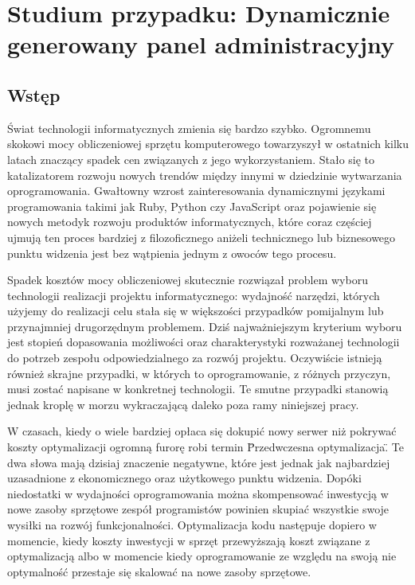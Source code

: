 \chapter[Studium przypadku: Dynamicznie generowany panel administracyjny]{Studium przypadku: Dynamicznie generowany panel administracyjny}
  \section{Wstęp}
  Świat technologii informatycznych zmienia się bardzo szybko. Ogromnemu skokowi mocy obliczeniowej sprzętu komputerowego towarzyszył w ostatnich kilku latach znaczący spadek cen związanych z jego wykorzystaniem. Stało się to katalizatorem rozwoju nowych trendów między innymi w dziedzinie wytwarzania oprogramowania. Gwałtowny wzrost zainteresowania dynamicznymi językami programowania takimi jak Ruby, Python czy JavaScript oraz pojawienie się nowych metodyk rozwoju produktów informatycznych, które coraz częściej ujmują ten proces bardziej z filozoficznego aniżeli technicznego lub biznesowego punktu widzenia jest bez wątpienia jednym z owoców tego procesu.
  
  Spadek kosztów mocy obliczeniowej skutecznie rozwiązał problem wyboru technologii realizacji projektu informatycznego: wydajność narzędzi, których użyjemy do realizacji celu stała się w większości przypadków pomijalnym lub przynajmniej drugorzędnym problemem. Dziś najważniejszym kryterium wyboru jest stopień dopasowania możliwości oraz charakterystyki rozważanej technologii do potrzeb zespołu odpowiedzialnego za rozwój projektu. Oczywiście istnieją również skrajne przypadki, w których to oprogramowanie, z różnych przyczyn, musi zostać napisane w konkretnej technologii. Te smutne przypadki stanowią jednak kroplę w morzu wykraczającą daleko poza ramy niniejszej pracy.
  
  W czasach, kiedy o wiele bardziej opłaca się dokupić nowy serwer niż pokrywać koszty optymalizacji ogromną furorę robi termin \"Przedwczesna optymalizacja\". Te dwa słowa mają dzisiaj znaczenie negatywne, które jest jednak jak najbardziej uzasadnione z ekonomicznego oraz użytkowego punktu widzenia. Dopóki niedostatki w wydajności oprogramowania można skompensować inwestycją w nowe zasoby sprzętowe zespół programistów powinien skupiać wszystkie swoje wysiłki na rozwój funkcjonalności. Optymalizacja kodu następuje dopiero w momencie, kiedy koszty inwestycji w sprzęt przewyższają koszt związane z optymalizacją albo w momencie kiedy oprogramowanie ze względu na swoją nie optymalność przestaje się skalować na nowe zasoby sprzętowe.
  
